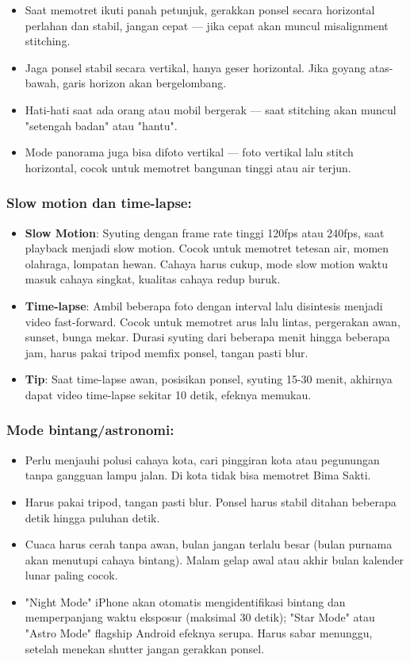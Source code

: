 \begin{itemize}
  \item Saat memotret ikuti panah petunjuk, gerakkan ponsel secara horizontal perlahan dan stabil, jangan cepat — jika cepat akan muncul misalignment stitching.
  \item Jaga ponsel stabil secara vertikal, hanya geser horizontal. Jika goyang atas-bawah, garis horizon akan bergelombang.
  \item Hati-hati saat ada orang atau mobil bergerak — saat stitching akan muncul "setengah badan" atau "hantu".
  \item Mode panorama juga bisa difoto vertikal — foto vertikal lalu stitch horizontal, cocok untuk memotret bangunan tinggi atau air terjun.
\end{itemize}

\subsubsection*{Slow motion dan time-lapse:}

\begin{itemize}
  \item \textbf{Slow Motion}: Syuting dengan frame rate tinggi 120fps atau 240fps, saat playback menjadi slow motion. Cocok untuk memotret tetesan air, momen olahraga, lompatan hewan. Cahaya harus cukup, mode slow motion waktu masuk cahaya singkat, kualitas cahaya redup buruk.
  \item \textbf{Time-lapse}: Ambil beberapa foto dengan interval lalu disintesis menjadi video fast-forward. Cocok untuk memotret arus lalu lintas, pergerakan awan, sunset, bunga mekar. Durasi syuting dari beberapa menit hingga beberapa jam, harus pakai tripod memfix ponsel, tangan pasti blur.
  \item \textbf{Tip}: Saat time-lapse awan, posisikan ponsel, syuting 15-30 menit, akhirnya dapat video time-lapse sekitar 10 detik, efeknya memukau.
\end{itemize}

\subsubsection*{Mode bintang/astronomi:}

\begin{itemize}
  \item Perlu menjauhi polusi cahaya kota, cari pinggiran kota atau pegunungan tanpa gangguan lampu jalan. Di kota tidak bisa memotret Bima Sakti.
  \item Harus pakai tripod, tangan pasti blur. Ponsel harus stabil ditahan beberapa detik hingga puluhan detik.
  \item Cuaca harus cerah tanpa awan, bulan jangan terlalu besar (bulan purnama akan menutupi cahaya bintang). Malam gelap awal atau akhir bulan kalender lunar paling cocok.
  \item "Night Mode" iPhone akan otomatis mengidentifikasi bintang dan memperpanjang waktu eksposur (maksimal 30 detik); "Star Mode" atau "Astro Mode" flagship Android efeknya serupa. Harus sabar menunggu, setelah menekan shutter jangan gerakkan ponsel.
\end{itemize}


